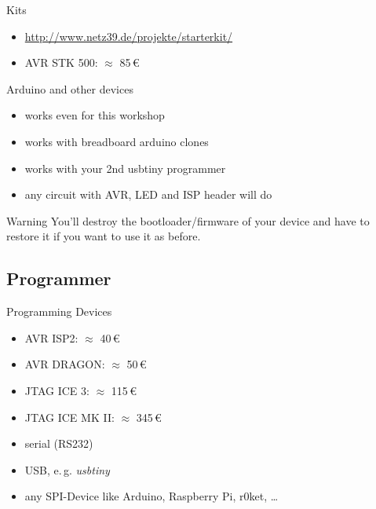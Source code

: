 \documentclass{beamer}
\begin{document}
\begin{frame}{Kits}
    \begin{figure}
    \end{figure}
    \begin{itemize}
        \item \url{http://www.netz39.de/projekte/starterkit/}
        \pause
        \item AVR STK 500: $\approx$ 85\,€
    \end{itemize}
\end{frame}


\begin{frame}{Arduino and other devices}
    \begin{itemize}
        \item works even for this workshop
        \item works with breadboard arduino clones
        \item works with your 2nd usbtiny programmer
        \item any circuit with AVR, LED and ISP header will do
    \end{itemize}
    \pause
    \begin{alertblock}{Warning}
        You'll destroy the bootloader/firmware of your device and have
        to restore it if you want to use it as before.
    \end{alertblock}
\end{frame}

\subsection{Programmer}

\begin{frame}{Programming Devices}
    \begin{itemize}
        \item{AVR ISP2: $\approx$ 40\,€}
        \item{AVR DRAGON: $\approx$ 50\,€}
        \item{JTAG ICE 3: $\approx$ 115\,€}
        \item{JTAG ICE MK II: $\approx$ 345\,€}
        \pause
        \item{serial (RS232)}
        \item{USB, e.\,g. \emph{usbtiny}}
        \item{any SPI-Device like Arduino, Raspberry Pi, r0ket, …}
    \end{itemize}
\end{frame}
\end{document}
